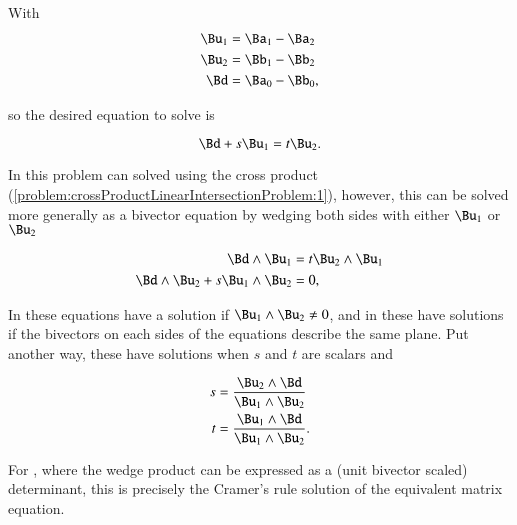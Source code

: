 With
\begin{dmath}\label{eqn:SimpleProducts2:1040}
\begin{aligned}
\Bu_1 &= \Ba_1 - \Ba_2 \\
\Bu_2 &= \Bb_1 - \Bb_2 \\
\Bd &= \Ba_0 - \Bb_0,
\end{aligned}
\end{dmath}

so the desired equation to solve is

\begin{dmath}\label{eqn:SimpleProducts2:1060}
\Bd + s \Bu_1 = t \Bu_2.
\end{dmath}

In  this problem can solved using the cross product (\cref{problem:crossProductLinearIntersectionProblem:1}), however, this can be solved more generally as a
bivector equation by wedging both sides with either \( \Bu_1 \) or \( \Bu_2 \)

\begin{dmath}\label{eqn:SimpleProducts2:1080}
\begin{aligned}
\Bd \wedge \Bu_1 &= t \Bu_2 \wedge \Bu_1 \\
\Bd \wedge \Bu_2 + s \Bu_1 \wedge \Bu_2 &= 0,
\end{aligned}
\end{dmath}

In  these equations have a solution if \( \Bu_1 \wedge \Bu_2 \ne 0 \), and in  these have solutions if the bivectors on each sides of the equations describe the same plane.
Put another way, these have solutions when \( s \) and \( t \) are scalars and

\begin{dmath}\label{eqn:SimpleProducts2:1100}
\begin{aligned}
s &= \frac{\Bu_2 \wedge \Bd}{\Bu_1 \wedge \Bu_2} \\
t &= \frac{\Bu_1 \wedge \Bd}{\Bu_1 \wedge \Bu_2}.
\end{aligned}
\end{dmath}

For ,
where the wedge product can be expressed as a (unit bivector scaled) determinant, this is precisely the Cramer's rule solution of the equivalent matrix equation.
